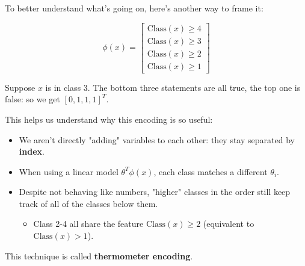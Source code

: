                 To better understand what's going on, here's another way to frame it:

                \begin{equation}
                    \phi(x) =
                    \begin{bmatrix}
                        \text{Class}(x)\geq 4 \\
                        \text{Class}(x)\geq 3\\
                        \text{Class}(x)\geq 2\\
                        \text{Class}(x)\geq 1
                    \end{bmatrix}
                \end{equation}

                \miniex Suppose $x$ is in class 3. The bottom three statements are all true, the top one is false: so we get $[0, 1, 1, 1]^T$. 

                This helps us understand why this encoding is so useful:
                
                \begin{itemize}
                    \item We aren't directly "adding" variables to each other: they stay separated by \textbf{index}.
                    
                    \item When using a linear model $\theta^T\phi(x)$, each class  matches a different $\theta_i$.
                        
                    \item Despite not behaving like numbers, "higher" classes in the order still keep track of all of the classes below them.
                        \begin{itemize}
                            \item \miniex Class 2-4 all share the feature $\text{Class}(x)\geq 2$ (equivalent to $\text{Class}(x)>1$).
                        \end{itemize}
                \end{itemize}

                This technique is called \textbf{thermometer encoding}.\\

